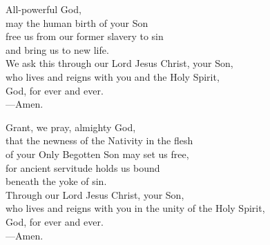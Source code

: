 \prayer

\begin{prayerverse}

All-powerful God,\\
may the human birth of your Son\\
free us from our former slavery to sin\\
and bring us to new life.\\
We ask this through our Lord Jesus Christ, your Son,\\
who lives and reigns with you and the Holy Spirit,\\
God, for ever and ever.\\
{\color{red}---\thinspace}Amen.

\end{prayerverse}


\begin{prayerverse}

Grant, we pray, almighty God,\\
that the newness of the Nativity in the flesh\\
of your Only Begotten Son may set us free,\\
for ancient servitude holds us bound\\
beneath the yoke of sin.\\
Through our Lord Jesus Christ, your Son,\\
who lives and reigns with you in the unity of the Holy Spirit,\\
God, for ever and ever.\\
{\color{red}---\thinspace}Amen.

\end{prayerverse}